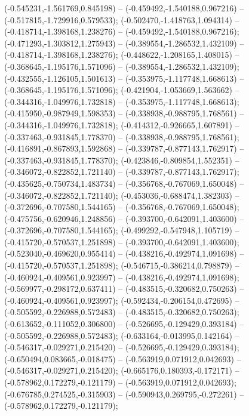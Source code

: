  (-0.545231,-1.561769,0.845198) -- (-0.459492,-1.540188,0.967216) -- (-0.517815,-1.729916,0.579533);
 (-0.502470,-1.418763,1.094314) -- (-0.418714,-1.398168,1.238276) -- (-0.459492,-1.540188,0.967216);
 (-0.471293,-1.303812,1.275943) -- (-0.389554,-1.286532,1.432109) -- (-0.418714,-1.398168,1.238276);
 (-0.448622,-1.208165,1.408015) -- (-0.368645,-1.195176,1.571096) -- (-0.389554,-1.286532,1.432109);
 (-0.432555,-1.126105,1.501613) -- (-0.353975,-1.117748,1.668613) -- (-0.368645,-1.195176,1.571096);
 (-0.421904,-1.053669,1.563662) -- (-0.344316,-1.049976,1.732818) -- (-0.353975,-1.117748,1.668613);
 (-0.415950,-0.987949,1.598353) -- (-0.338938,-0.988795,1.768561) -- (-0.344316,-1.049976,1.732818);
 (-0.414312,-0.926665,1.607891) -- (-0.337463,-0.931845,1.778370) -- (-0.338938,-0.988795,1.768561);
 (-0.416891,-0.867893,1.592868) -- (-0.339787,-0.877143,1.762917) -- (-0.337463,-0.931845,1.778370);
 (-0.423846,-0.809854,1.552351) -- (-0.346072,-0.822852,1.721140) -- (-0.339787,-0.877143,1.762917);
 (-0.435625,-0.750734,1.483734) -- (-0.356768,-0.767069,1.650048) -- (-0.346072,-0.822852,1.721140);
 (-0.453036,-0.688474,1.382303) -- (-0.372696,-0.707580,1.544165) -- (-0.356768,-0.767069,1.650048);
 (-0.475756,-0.620946,1.248856) -- (-0.393700,-0.642091,1.403600) -- (-0.372696,-0.707580,1.544165);
 (-0.499292,-0.547948,1.105719) -- (-0.415720,-0.570537,1.251898) -- (-0.393700,-0.642091,1.403600);
 (-0.523040,-0.469620,0.955414) -- (-0.438216,-0.492974,1.091698) -- (-0.415720,-0.570537,1.251898);
 (-0.546715,-0.386214,0.798879) -- (-0.460924,-0.409561,0.923997) -- (-0.438216,-0.492974,1.091698);
 (-0.569977,-0.298172,0.637411) -- (-0.483515,-0.320682,0.750263) -- (-0.460924,-0.409561,0.923997);
 (-0.592434,-0.206154,0.472695) -- (-0.505592,-0.226988,0.572483) -- (-0.483515,-0.320682,0.750263);
 (-0.613652,-0.111052,0.306800) -- (-0.526695,-0.129429,0.393184) -- (-0.505592,-0.226988,0.572483);
 (-0.633164,-0.013995,0.142164) -- (-0.546317,-0.029271,0.215420) -- (-0.526695,-0.129429,0.393184);
 (-0.650494,0.083665,-0.018475) -- (-0.563919,0.071912,0.042693) -- (-0.546317,-0.029271,0.215420);
 (-0.665176,0.180393,-0.172171) -- (-0.578962,0.172279,-0.121179) -- (-0.563919,0.071912,0.042693);
 (-0.676785,0.274525,-0.315903) -- (-0.590943,0.269795,-0.272261) -- (-0.578962,0.172279,-0.121179);
